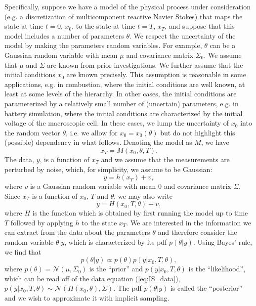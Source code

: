 \documentclass[11pt]{article}
\newcommand{\MarginPar}[1]{\marginpar{%
\vskip-\baselineskip %
\raggedright\tiny\sffamily
\hrule\smallskip{\color{red}#1}\par\smallskip\hrule}}
\begin{document}
Specifically, suppose we have  a  model of the physical process under consideration (e.g. a discretization of multicomponent reactive Navier Stokes) that maps the state at time $t=0$, $x_0$, to the state at time $t=T$, $x_T$, and suppose that this model includes a number of parameters $\theta$.
We respect the uncertainty of the model by making the parameters random variables.
For example, $\theta$ can be a Gaussian random variable with mean $\mu$ and covariance matrix $\Sigma_0$. We assume that $\mu$ and $\Sigma$ are known from prior investigations.
We further assume that the initial conditions $x_0$ are known precisely.
This assumption is reasonable in some applications, e.g. in combustion, where the initial conditions are well known, at least at some levels of the hierarchy.
In other cases, the initial conditions are parameterized by a relatively small number of (uncertain) parameters, e.g. in battery simulation, where the initial conditions are characterized by the initial voltage of the macroscopic cell.
In these cases, we lump the uncertainty of $x_0$ into the random vector $\theta$, i.e. we allow for $x_0 =x_0(\theta)$ but do not highlight this (possible) dependency in what follows.
\MarginPar{Matti: is this correct?} Denoting the model as $M$, we have
\begin{equation}
	x_T = M(x_0,\theta, T).
\end{equation}
The data, $y$, is a function of $x_T$ and we assume that the measurements are perturbed by noise, which, for simplicity, we assume to be Gaussian:
\begin{equation}
	y = h(x_T)+v,
\end{equation}
where $v$ is a Gaussian random variable with mean $0$ and covariance matrix $\Sigma$. Since $x_T$ is a function of $x_0$, $T$ and $\theta$, we may also write
\begin{equation}
\label{eq:IS_data}
	y = H(x_0,T,\theta)+v,
\end{equation}
where $H$ is the function which is obtained by first running the model up to time $T$ followed by applying $h$ to the state $x_T$.  We are interested in the information we can extract from the data about the parameters $\theta$ and therefore consider the random variable $\theta|y$, which is characterized by its pdf $p(\theta|y)$. Using Bayes' rule, we find that
\begin{equation}
	p(\theta|y) \propto p(\theta)p(y|x_0,T,\theta),
\end{equation}
where  $p(\theta) = \mathcal{N}(\mu,\Sigma_0)$ is the ``prior'' and $p(y|x_0,T,\theta)$ is the ``likelihood'', which can be read off of the data equation (\ref{eq:IS_data}), $p(y|x_0,T,\theta)\sim \mathcal{N}(H(x_0,\theta),\Sigma)$.
The pdf $p(\theta|y)$  is called the ``posterior'' and we wish to approximate it with implicit sampling. 
\end{document}
